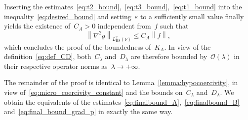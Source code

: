 \documentclass[10pt]{article}
\newcommand{\1}{\mathbbm 1}
\begin{document}
Inserting the estimates~\eqref{eq:t2_bound},~\eqref{eq:t3_bound},~\eqref{eq:t1_bound} into the inequality~\eqref{eq:desired_bound} and setting~$\varepsilon$ to a sufficiently small value finally yields the existence of~$C_{A}>0$ independent from~$f$ such that
\begin{equation}
    \left\|\nabla^2 g\right\|_{L^2_{\mathrm{HS}}(\nu)}\leq C_A\left\|f\right\|,
\end{equation}
which concludes the proof of the boundedness of~$K_A$. In view of the definition~\eqref{eq:def_CD}, both~$C_\lambda$ and~$D_\lambda$ are therefore bounded by~$\mathcal O(\lambda)$ in their respective operator norms as~$\lambda\to +\infty$.

The remainder of the proof is identical to Lemma~\ref{lemma:hypocoercivity}, in view of~\eqref{eq:micro_coercivity_constant} and the bounds on~$C_\lambda$ and~$D_\lambda$.
We obtain the equivalents of the estimates~\eqref{eq:finalbound_A},~\eqref{eq:finalbound_B} and~\eqref{eq:final_bound_grad_p} in exactly the same way.
\end{document}
